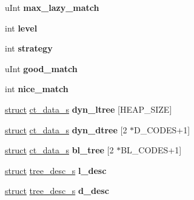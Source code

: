 \begin{DoxyCompactItemize}
u\+Int {\bfseries max\+\_\+lazy\+\_\+match}
\item 
\mbox{\label{structinternal__state_a7ad2ab1df80c8cab4ffb97ff84e88c62}} 
int {\bfseries level}
\item 
\mbox{\label{structinternal__state_a67219312df7fd2f86e06e6f14700eb28}} 
int {\bfseries strategy}
\item 
\mbox{\label{structinternal__state_a68ba00254242017f330dca5e0191bca4}} 
u\+Int {\bfseries good\+\_\+match}
\item 
\mbox{\label{structinternal__state_a39ab99e52138c0628f645bc1e0c69a04}} 
int {\bfseries nice\+\_\+match}
\item 
\mbox{\label{structinternal__state_ae11867c05d54c575dbc713bbea71266c}} 
\hyperlink{interfacestruct}{struct} \hyperlink{structct__data__s}{ct\+\_\+data\+\_\+s} {\bfseries dyn\+\_\+ltree} \mbox{[}H\+E\+A\+P\+\_\+\+S\+I\+ZE\mbox{]}
\item 
\mbox{\label{structinternal__state_a42a52476d3cde41e57a6ef2a6a78008f}} 
\hyperlink{interfacestruct}{struct} \hyperlink{structct__data__s}{ct\+\_\+data\+\_\+s} {\bfseries dyn\+\_\+dtree} \mbox{[}2 $\ast$D\+\_\+\+C\+O\+D\+ES+1\mbox{]}
\item 
\mbox{\label{structinternal__state_a98131fc5b64d0d7542bc3621aef19854}} 
\hyperlink{interfacestruct}{struct} \hyperlink{structct__data__s}{ct\+\_\+data\+\_\+s} {\bfseries bl\+\_\+tree} \mbox{[}2 $\ast$B\+L\+\_\+\+C\+O\+D\+ES+1\mbox{]}
\item 
\mbox{\label{structinternal__state_a0266c4e0250652904e6b4908d8da84a9}} 
\hyperlink{interfacestruct}{struct} \hyperlink{structtree__desc__s}{tree\+\_\+desc\+\_\+s} {\bfseries l\+\_\+desc}
\item 
\mbox{\label{structinternal__state_ab2fddb383d3055b6ec81c7fef14e99d8}} 
\hyperlink{interfacestruct}{struct} \hyperlink{structtree__desc__s}{tree\+\_\+desc\+\_\+s} {\bfseries d\+\_\+desc}
\item 

\end{DoxyCompactItemize}
